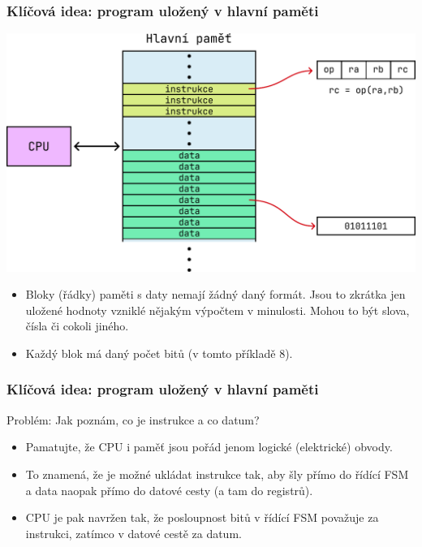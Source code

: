 \documentclass[aspectratio=169,11pt,svgnames]{beamer}
\begin{document}
\begin{frame}
 \frametitle{Klíčová idea: program uložený v hlavní paměti}
 \begin{center}
  \includegraphics[width=.5\textwidth]{instructions-4.pdf}
 \end{center}
 \vspace*{-1em}
 \begin{itemize}[label=\textbullet]
  \item Bloky (řádky) paměti s daty nemají žádný daný formát. Jsou to zkrátka
   jen uložené hodnoty vzniklé nějakým výpočtem v minulosti. Mohou to být slova,
   čísla či cokoli jiného.
  \pause
  \item Každý blok má daný počet bitů (v tomto příkladě 8).
 \end{itemize}
\end{frame}

\begin{frame}
 \frametitle{Klíčová idea: program uložený v hlavní paměti}
 \alert{Problém:} Jak poznám, co je instrukce a co datum?\pause\\
 \begin{itemize}[label=\textbullet]
  \item Pamatujte, že CPU i paměť jsou pořád jenom logické (elektrické)
   obvody.\pause
  \item To znamená, že je možné ukládat instrukce tak, aby šly přímo do
   \alert{řídící FSM} a data naopak přímo do \alert{datové cesty (a tam do
   registrů)}.\pause
  \item CPU je pak navržen tak, že posloupnost bitů v řídící FSM považuje za
   instrukci, zatímco v datové cestě za datum.
 \end{itemize}
\end{frame}
\end{document}
